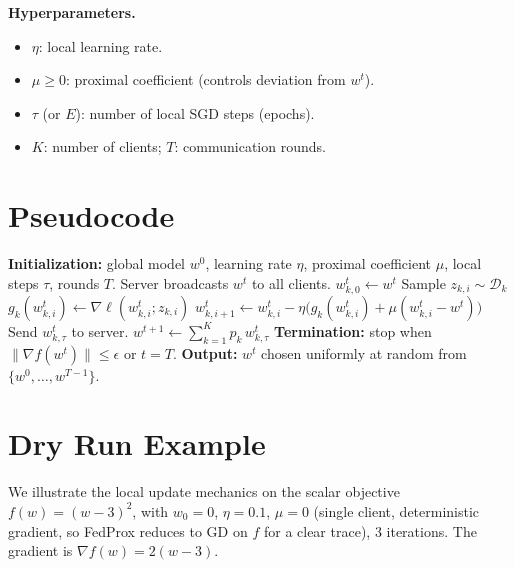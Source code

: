 \documentclass{article}
\begin{document}
\textbf{Hyperparameters.}
\begin{itemize}
  \item $\eta$: local learning rate.
  \item $\mu \ge 0$: proximal coefficient (controls deviation from $w^t$).
  \item $\tau$ (or $E$): number of local SGD steps (epochs).
  \item $K$: number of clients; $T$: communication rounds.
\end{itemize}

\section*{Pseudocode}

\begin{algorithm}[h]
\caption{FedProx (Non-Convex)}
\begin{algorithmic}[1]
\State \textbf{Initialization:} global model $w^0$, learning rate $\eta$, proximal coefficient $\mu$, local steps $\tau$, rounds $T$.
    \State Server broadcasts $w^t$ to all clients.
        \State $w_{k,0}^t \gets w^t$
            \State Sample $z_{k,i} \sim \mathcal{D}_k$
            \State $g_k(w_{k,i}^t) \gets \nabla \ell(w_{k,i}^t; z_{k,i})$
            \State $w_{k,i+1}^t \gets w_{k,i}^t - \eta\big(g_k(w_{k,i}^t) + \mu(w_{k,i}^t - w^t)\big)$
        \EndFor
        \State Send $w_{k,\tau}^t$ to server.
    \EndFor
    \State $w^{t+1} \gets \sum_{k=1}^K p_k \, w_{k,\tau}^t$
\EndFor
\State \textbf{Termination:} stop when $\|\nabla f(w^t)\| \le \epsilon$ or $t = T$.
\State \textbf{Output:} $w^t$ chosen uniformly at random from $\{w^0,\dots,w^{T-1}\}$.
\end{algorithmic}
\end{algorithm}

\section*{Dry Run Example}

We illustrate the local update mechanics on the scalar objective $f(w) = (w-3)^2$, with $w_0 = 0$, $\eta = 0.1$, $\mu = 0$ (single client, deterministic gradient, so FedProx reduces to GD on $f$ for a clear trace), $3$ iterations.
The gradient is $\nabla f(w) = 2(w-3)$.
\end{document}
